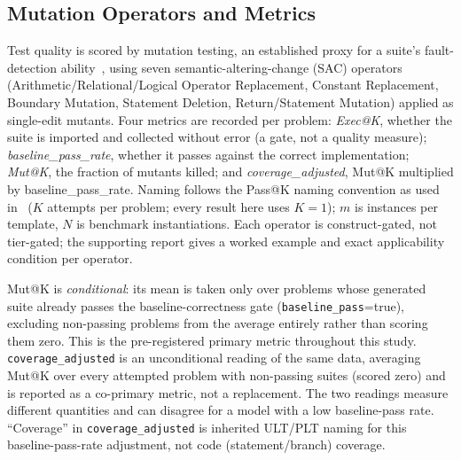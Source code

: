\subsection{Mutation Operators and Metrics}
\label{sec:methods-metrics}
Test quality is scored by mutation testing, an established proxy for a suite's fault-detection ability~\cite{jia2011mutation}, using seven semantic-altering-change (SAC) operators (Arithmetic/Relational/Logical Operator Replacement, Constant Replacement, Boundary Mutation, Statement Deletion, Return/Statement Mutation) applied as single-edit mutants. Four metrics are recorded per problem: \emph{Exec@K}, whether the suite is imported and collected without error (a gate, not a quality measure); \emph{baseline\_pass\_rate}, whether it passes against the correct implementation; \emph{Mut@K}, the fraction of mutants killed; and \emph{coverage\_adjusted}, Mut@K multiplied by baseline\_pass\_rate. Naming follows the Pass@K naming convention as used in~\cite{chen2025dycodeeval} ($K$ attempts per problem; every result here uses $K=1$); $m$ is instances per template, $N$ is benchmark instantiations. Each operator is construct-gated, not tier-gated; the supporting report gives a worked example and exact applicability condition per operator.

Mut@K is \emph{conditional}: its mean is taken only over problems whose generated suite already passes the baseline-correctness gate (\texttt{baseline\_pass}=true), excluding non-passing problems from the average entirely rather than scoring them zero. This is the pre-registered primary metric throughout this study. \texttt{coverage\_adjusted} is an unconditional reading of the same data, averaging Mut@K over every attempted problem with non-passing suites (scored zero) and is reported as a co-primary metric, not a replacement. The two readings measure different quantities and can disagree for a model with a low baseline-pass rate. ``Coverage'' in \texttt{coverage\_adjusted} is inherited ULT/PLT naming for this baseline-pass-rate adjustment, not code (statement/branch) coverage.


